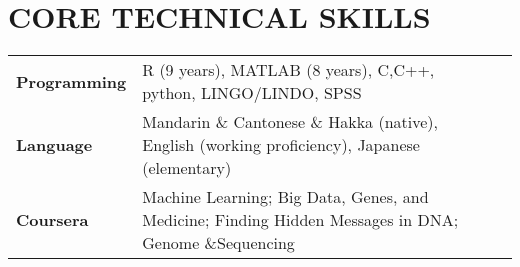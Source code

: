 \documentclass[10pt,letterpaper]{article}
\begin{document}
\section*{CORE TECHNICAL SKILLS}
\begin{table}[h!]
\begin{tabular}{lll}
\textbf{Programming}&R (9 years), MATLAB (8 years), C,C++, python, LINGO/LINDO, SPSS&\\
\textbf{Language}&Mandarin \& Cantonese \& Hakka (native), English (working proficiency), Japanese (elementary)&\\
\textbf{Coursera}&Machine Learning; Big Data, Genes, and Medicine; Finding Hidden Messages in DNA; Genome \&Sequencing&\\
\end{tabular}
\end{table}
%
%
%  
%
\end{document}
